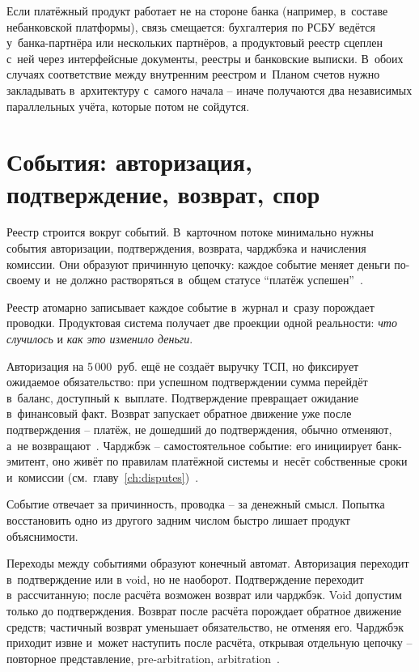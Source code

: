 Если платёжный продукт работает не на стороне банка (например,
в~составе небанковской платформы), связь смещается: бухгалтерия
по РСБУ ведётся у~банка-партнёра или нескольких партнёров,
а продуктовый реестр сцеплен с~ней через интерфейсные документы,
реестры и банковские выписки. В~обоих случаях соответствие между
внутренним реестром и~Планом счетов нужно закладывать в~архитектуру
с~самого начала -- иначе получаются два независимых параллельных
учёта, которые потом не сойдутся.

\section{События: авторизация, подтверждение, возврат, спор}\label{sec:ledger-events}

Реестр строится вокруг событий. В~карточном потоке минимально
нужны события авторизации, подтверждения, возврата, чарджбэка
и начисления комиссии. Они образуют причинную цепочку: каждое
событие меняет деньги по-своему и~не должно растворяться в~общем
статусе \enquote{платёж успешен}~\cite{mc-tpr,mc-chargeback-guide,adyen-glossary}.

Реестр атомарно записывает каждое событие в~журнал и~сразу
порождает проводки. Продуктовая система получает две проекции
одной реальности: \textit{что случилось} и \textit{как это
изменило деньги}.

Авторизация на 5\,000~руб. ещё не создаёт выручку ТСП, но фиксирует
ожидаемое обязательство: при успешном подтверждении сумма перейдёт
в~баланс, доступный к~выплате. Подтверждение превращает ожидание
в~финансовый факт. Возврат запускает обратное движение уже после
подтверждения -- платёж, не дошедший до подтверждения, обычно
отменяют, а~не возвращают~\cite{adyen-glossary,stripe-manual-capture}.
Чарджбэк -- самостоятельное событие: его инициирует банк-эмитент,
оно живёт по правилам платёжной системы и~несёт собственные сроки
и~комиссии (см.\ главу~\ref{ch:disputes})~\cite{adyen-glossary,mc-chargeback-guide}.


Событие отвечает за причинность, проводка -- за денежный смысл.
Попытка восстановить одно из другого задним числом быстро лишает
продукт объяснимости.

Переходы между событиями образуют конечный автомат. Авторизация
переходит в~подтверждение или в void, но не наоборот. Подтверждение
переходит в~рассчитанную; после расчёта возможен возврат или чарджбэк.
Void допустим только до подтверждения. Возврат после расчёта порождает
обратное движение средств; частичный возврат уменьшает обязательство,
не отменяя его. Чарджбэк приходит извне и~может наступить после
расчёта, открывая отдельную цепочку -- повторное представление,
pre-arbitration, arbitration~\cite{visa-core-rules,mc-chargeback-guide}.


